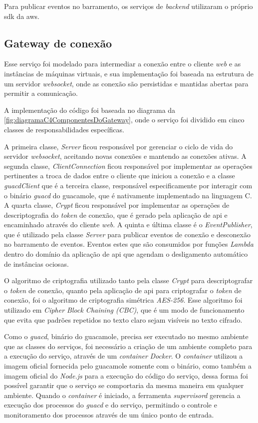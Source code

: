 Para publicar eventos no barramento, os serviços de \textit{backend} utilizaram o próprio \gls{sdk} da \gls{aws}.

\subsection{Gateway de conexão}
\label{subsec:gatewayDeConexao}

Esse serviço foi modelado para intermediar a conexão entre o cliente \textit{web} e as instâncias de máquinas virtuais, e sua implementação foi baseada na estrutura de um servidor \textit{websocket}, onde as conexão são persistidas e mantidas abertas para permitir a comunicação.

A implementação do código foi baseada no diagrama da \autoref{fig:diagramaC4ComponentesDoGateway}, onde o serviço foi dividido em cinco classes de responsabilidades específicas.

A primeira classe, \textit{Server} ficou responsável por gerenciar o ciclo de vida do servidor \textit{websocket}, aceitando novas conexões e mantendo as conexões ativas. A segunda classe, \textit{ClientConnection} ficou responsável por implementar as operações pertinentes a troca de dados entre o cliente que iniciou a conexão e a classe \textit{guacdClient} que é a terceira classe, responsável especificamente por interagir com o binário \textit{guacd} do \gls{guacamole}, que é nativamente implementado na linguagem C. A quarta classe, \textit{Crypt} ficou responsável por implementar as operações de descriptografia do \textit{token} de conexão, que é gerado pela aplicação de \gls{api} e encaminhado através do cliente \textit{web}. A quinta e última classe é o \textit{EventPublisher}, que é utilizado pela classe \textit{Server} para publicar eventos de conexão e desconexão no barramento de eventos. Eventos estes que são consumidos por funções \textit{Lambda} dentro do domínio da aplicação de \gls{api} que agendam o desligamento automático de instâncias ociosas.

O algoritmo de criptografia utilizado tanto pela classe \textit{Crypt} para descriptografar o \textit{token} de conexão, quanto pela aplicação de \gls{api} para criptografar o \textit{token} de conexão, foi o algoritmo de criptografia simétrica \textit{AES-256}. Esse algoritmo foi utilizado em \textit{Cipher Block Chaining (CBC)}, que é um modo de funcionamento que evita que padrões repetidos no texto claro sejam visíveis no texto cifrado.

Como o \textit{guacd}, binário do \gls{guacamole}, precisa ser executado no mesmo ambiente que as classes do serviços, foi necessário a criação de um ambiente completo para a execução do serviço, através de um \textit{container} \textit{Docker}. O \textit{container} utilizou a imagem oficial fornecida pelo \gls{guacamole} somente com o binário, como também a imagem oficial do \textit{Node.js} para a execução do código do serviço, dessa forma foi possível garantir que o serviço se comportaria da mesma maneira em qualquer ambiente. Quando o \textit{container} é iniciado, a ferramenta \textit{supervisord} gerencia a execução dos processos do \textit{guacd} e do serviço, permitindo o controle e monitoramento dos processos através de um único ponto de entrada.

